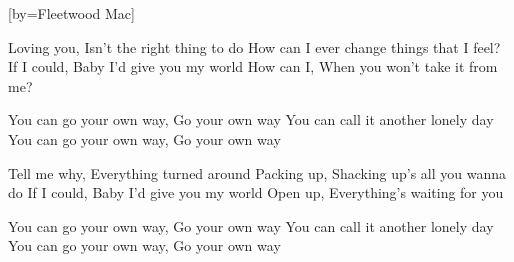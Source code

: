 

[by=Fleetwood Mac]

\begin{LARGE}


\beginverse
Loving you, Isn't the right thing to do
How can I ever change things that I feel?
If I could, Baby I'd give you my world
How can I, When you won't take it from me?
\endverse

\beginchorus
You can go your own way, Go your own way
You can call it another lonely day
You can go your own way, Go your own way
\endchorus

\beginverse
Tell me why, Everything turned around
Packing up, Shacking up's all you wanna do
If I could, Baby I'd give you my world
Open up, Everything's waiting for you
\endverse

\beginchorus
You can go your own way, Go your own way
You can call it another lonely day
You can go your own way, Go your own way
\endchorus

\end{LARGE}


\chordson
\endsong
